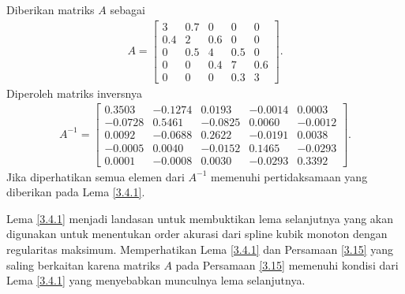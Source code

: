 \begin{contoh}
    Diberikan matriks $A$ sebagai
    \begin{gather*}
        A=\begin{bmatrix}
            3 & 0.7 & 0 & 0 & 0 \\
            0.4 & 2 & 0.6 & 0 & 0 \\
            0 & 0.5 & 4 & 0.5 & 0 \\
            0 & 0 & 0.4 & 7 & 0.6 \\ 
            0 & 0 & 0 & 0.3 & 3
        \end{bmatrix}.
    \end{gather*}
    Diperoleh matriks inversnya
    \begin{gather*}
        A^{-1}=\begin{bmatrix}
            0.3503 & -0.1274 & 0.0193 & -0.0014 & 0.0003 \\
            -0.0728 & 0.5461 & -0.0825 & 0.0060 & -0.0012 \\
            0.0092 & -0.0688 & 0.2622 & -0.0191 & 0.0038 \\
            -0.0005 & 0.0040 & -0.0152 & 0.1465 & -0.0293\\ 
            0.0001 & -0.0008 & 0.0030 & -0.0293 & 0.3392
        \end{bmatrix}.
    \end{gather*}
    Jika diperhatikan semua elemen dari $A^{-1}$ memenuhi pertidaksamaan yang diberikan pada Lema \ref{3.4.1}.
\end{contoh}

Lema \ref{3.4.1} menjadi landasan untuk membuktikan lema selanjutnya yang akan digunakan untuk menentukan order akurasi dari spline kubik monoton dengan regularitas maksimum. Memperhatikan Lema \ref{3.4.1} dan Persamaan \eqref{3.15} yang saling berkaitan karena matriks $A$ pada Persamaan \eqref{3.15} memenuhi kondisi dari Lema \ref{3.4.1} yang menyebabkan munculnya lema selanjutnya.

